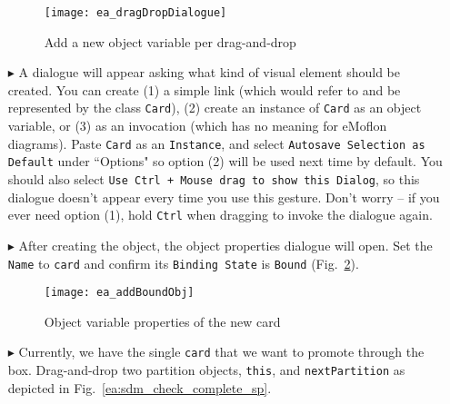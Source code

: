 \begin{itemize}
\vspace{0.5cm}

\begin{figure}[htbp]
\begin{center}
  \texttt{[image: ea\_dragDropDialogue]}
  \caption{Add a new object variable per drag-and-drop}
  \label{ea:sdm_check_bound_card}
\end{center}
\end{figure}

\item[$\blacktriangleright$] A dialogue will appear asking what kind of visual element should be created. You can create (1) a simple link (which would refer to
and be represented by the class \texttt{Card}), (2) create an instance of \texttt{Card} as an object variable, or (3) as an invocation (which has no meaning
for eMoflon diagrams). Paste \texttt{Card} as an \texttt{Instance}, and select \texttt{Autosave Selection as Default} under ``Options" so option (2) will be
used next time by default. You should also select \texttt{Use Ctrl + Mouse drag to show this Dialog}, so this dialogue doesn't appear every time you use this
gesture. Don't worry -- if you ever need option (1), hold \texttt{Ctrl} when dragging to invoke the dialogue again.

\vspace{0.5cm}

\item[$\blacktriangleright$] After creating the object, the object properties dialogue will open.  Set the \texttt{Name} to \texttt{card} and confirm its
\texttt{Binding State} is \texttt{Bound} (Fig.~\ref{ea:sdm_new_card_properties}).

\begin{figure}[htbp]
\begin{center}
  \texttt{[image: ea\_addBoundObj]}
  \caption{Object variable properties of the new card}
  \label{ea:sdm_new_card_properties}
\end{center}
\end{figure}

\vspace{0.5cm}

\item[$\blacktriangleright$] Currently, we have the single \texttt{card} that we want to promote through the box. Drag-and-drop two partition objects,
\texttt{this}, and \texttt{next\-Part\-it\-ion} as depicted in Fig.~\ref{ea:sdm_check_complete_sp}.

\vspace{0.5cm}


\end{itemize}
